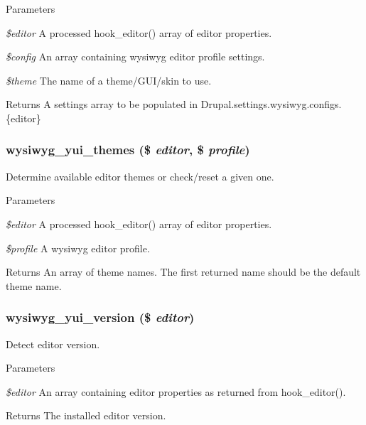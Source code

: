 \begin{DoxyParams}{Parameters}
\item[{\em \$editor}]A processed hook\_\-editor() array of editor properties. \item[{\em \$config}]An array containing wysiwyg editor profile settings. \item[{\em \$theme}]The name of a theme/GUI/skin to use.\end{DoxyParams}
\begin{DoxyReturn}{Returns}
A settings array to be populated in Drupal.settings.wysiwyg.configs.\{editor\} 
\end{DoxyReturn}
\hypertarget{yui_8inc_abd3af048178ed76c3d45a637b51ca837}{
\subsubsection[{wysiwyg\_\-yui\_\-themes}]{\setlength{\rightskip}{0pt plus 5cm}wysiwyg\_\-yui\_\-themes (\$ {\em editor}, \/  \$ {\em profile})}}
\label{yui_8inc_abd3af048178ed76c3d45a637b51ca837}
Determine available editor themes or check/reset a given one.


\begin{DoxyParams}{Parameters}
\item[{\em \$editor}]A processed hook\_\-editor() array of editor properties. \item[{\em \$profile}]A wysiwyg editor profile.\end{DoxyParams}
\begin{DoxyReturn}{Returns}
An array of theme names. The first returned name should be the default theme name. 
\end{DoxyReturn}
\hypertarget{yui_8inc_aae999a8334aac1436876db8b3c20d78d}{
\subsubsection[{wysiwyg\_\-yui\_\-version}]{\setlength{\rightskip}{0pt plus 5cm}wysiwyg\_\-yui\_\-version (\$ {\em editor})}}
\label{yui_8inc_aae999a8334aac1436876db8b3c20d78d}
Detect editor version.


\begin{DoxyParams}{Parameters}
\item[{\em \$editor}]An array containing editor properties as returned from hook\_\-editor().\end{DoxyParams}
\begin{DoxyReturn}{Returns}
The installed editor version. 
\end{DoxyReturn}
